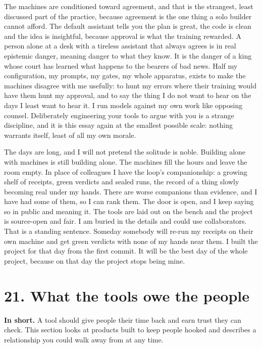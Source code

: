 \documentclass[11pt]{article}
\begin{document}
The machines are conditioned toward agreement, and that is the strangest, least discussed part of the practice, because agreement is the one thing a solo builder cannot afford. The default assistant tells you the plan is great, the code is clean and the idea is insightful, because approval is what the training rewarded. A person alone at a desk with a tireless assistant that always agrees is in real epistemic danger, meaning danger to what they know. It is the danger of a king whose court has learned what happens to the bearers of bad news. Half my configuration, my prompts, my gates, my whole apparatus, exists to make the machines disagree with me usefully: to hunt my errors where their training would have them hunt my approval, and to say the thing I do not want to hear on the days I least want to hear it. I run models against my own work like opposing counsel. Deliberately engineering your tools to argue with you is a strange discipline, and it is this essay again at the smallest possible scale: nothing warrants itself, least of all my own morale.

The days are long, and I will not pretend the solitude is noble. Building alone with machines is still building alone. The machines fill the hours and leave the room empty. In place of colleagues I have the loop's companionship: a growing shelf of receipts, green verdicts and sealed runs, the record of a thing slowly becoming real under my hands. There are worse companions than evidence, and I have had some of them, so I can rank them. The door is open, and I keep saying so in public and meaning it. The tools are laid out on the bench and the project is source-open and fair. I am buried in the details and could use collaborators. That is a standing sentence. Someday somebody will re-run my receipts on their own machine and get green verdicts with none of my hands near them. I built the project for that day from the first commit. It will be the best day of the whole project, because on that day the project stops being mine.

\section*{21. What the tools owe the people}

\textbf{In short.} A tool should give people their time back and earn trust they can check. This section looks at products built to keep people hooked and describes a relationship you could walk away from at any time.
\end{document}
